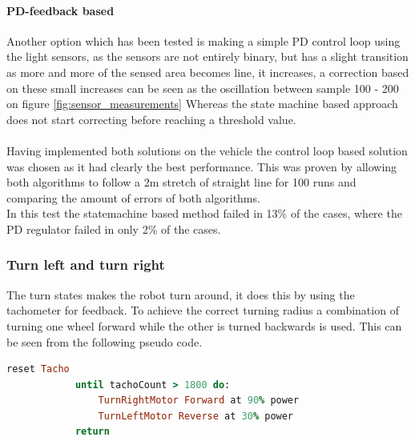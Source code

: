 \documentclass[draft, english, a4paper]{article}
\begin{document}
            \paragraph{PD-feedback based}
            Another option which has been tested is making a simple PD control loop
            using the light sensors, as the sensors are not entirely binary,
            but has a slight transition as more and more of the sensed area becomes
            line, it increases, a correction based on these small increases can 
            be seen as the oscillation between sample 100 - 200 on figure \ref{fig:sensor_measurements}
            Whereas the state machine based approach does not start correcting before reaching a threshold value.\\
            \\
            Having implemented both solutions on the vehicle the control loop based
            solution was chosen as it had clearly the best performance. This
            was proven by allowing both algorithms to follow a 2m stretch of
            straight line for 100 runs and comparing the amount of errors of both algorithms.
            \\
            In this test the statemachine based method failed in 13\% of the
            cases, where the PD regulator failed in only 2\% of the cases.
             
            
            
	    \subsubsection{Turn left and turn right}
	        The turn states makes the robot turn around,
	        it does this by using the tachometer for feedback.
	        To achieve the correct turning radius a combination of turning one
	        wheel forward while the other is turned backwards is used. This
	        can be seen from the following pseudo code.
	        \begin{lstlisting}[language=Ruby, frame=single, basicstyle=\small, caption={TurnLeft Pseudo example}, label={code:turnleft}]
	        reset Tacho
	        until tachoCount > 1800 do:
	            TurnRightMotor Forward at 90% power
	            TurnLeftMotor Reverse at 30% power
	        return
	        \end{lstlisting}
\end{document}
